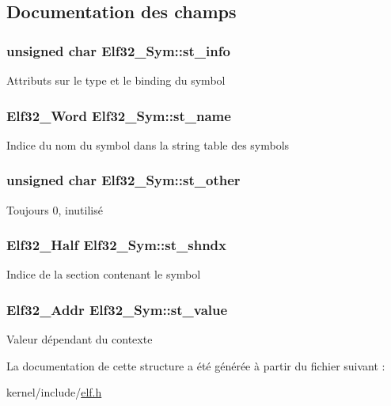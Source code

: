 \subsection{Documentation des champs}
\hypertarget{structElf32__Sym_a7d131c44ec48708b1c98f9b00ca9d528}{
\subsubsection[{st\-\_\-info}]{\setlength{\rightskip}{0pt plus 5cm}unsigned char Elf32\-\_\-\-Sym\-::st\-\_\-info}}\label{structElf32__Sym_a7d131c44ec48708b1c98f9b00ca9d528}
Attributs sur le type et le binding du symbol \hypertarget{structElf32__Sym_a6a972b30868879f8a1e071e0c45e5031}{
\subsubsection[{st\-\_\-name}]{\setlength{\rightskip}{0pt plus 5cm}Elf32\-\_\-\-Word Elf32\-\_\-\-Sym\-::st\-\_\-name}}\label{structElf32__Sym_a6a972b30868879f8a1e071e0c45e5031}
Indice du nom du symbol dans la string table des symbols \hypertarget{structElf32__Sym_a2e1bf6bedb5180f74ea8cbaf9cedfd36}{
\subsubsection[{st\-\_\-other}]{\setlength{\rightskip}{0pt plus 5cm}unsigned char Elf32\-\_\-\-Sym\-::st\-\_\-other}}\label{structElf32__Sym_a2e1bf6bedb5180f74ea8cbaf9cedfd36}
Toujours 0, inutilisé \hypertarget{structElf32__Sym_a46e54847ab00fbea62df8ee5dff8dec6}{
\subsubsection[{st\-\_\-shndx}]{\setlength{\rightskip}{0pt plus 5cm}Elf32\-\_\-\-Half Elf32\-\_\-\-Sym\-::st\-\_\-shndx}}\label{structElf32__Sym_a46e54847ab00fbea62df8ee5dff8dec6}
Indice de la section contenant le symbol \hypertarget{structElf32__Sym_abf8ff76884bc5e2acb5f7eb42f733c2e}{
\subsubsection[{st\-\_\-value}]{\setlength{\rightskip}{0pt plus 5cm}Elf32\-\_\-\-Addr Elf32\-\_\-\-Sym\-::st\-\_\-value}}\label{structElf32__Sym_abf8ff76884bc5e2acb5f7eb42f733c2e}
Valeur dépendant du contexte 

La documentation de cette structure a été générée à partir du fichier suivant \-:\begin{DoxyCompactItemize}
\item 
kernel/include/\hyperlink{elf_8h}{elf.\-h}\end{DoxyCompactItemize}
